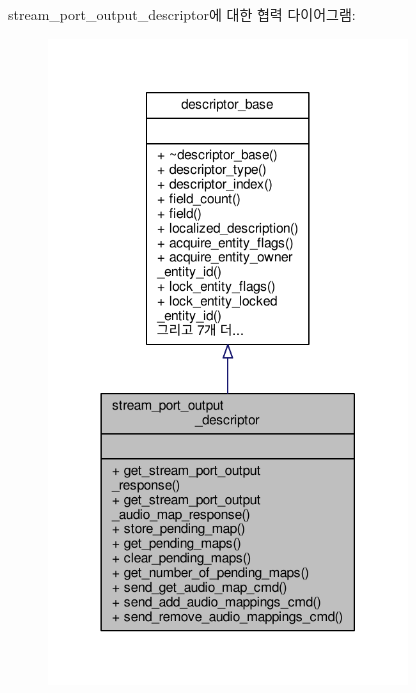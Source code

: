 stream\+\_\+port\+\_\+output\+\_\+descriptor에 대한 협력 다이어그램\+:
\nopagebreak
\begin{figure}[H]
\begin{center}
\leavevmode
\includegraphics[width=270pt]{classavdecc__lib_1_1stream__port__output__descriptor__coll__graph}
\end{center}
\end{figure}
